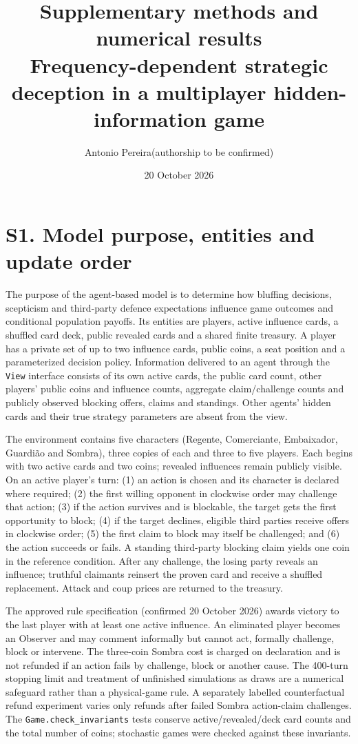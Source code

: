 \documentclass[10pt,a4paper]{article}
\title{Supplementary methods and numerical results\\\normalsize Frequency-dependent strategic deception in a multiplayer hidden-information game}
\author{Antonio Pereira\quad (authorship to be confirmed)}
\date{20 October 2026}
\begin{document}
\maketitle

\section*{S1. Model purpose, entities and update order}
The purpose of the agent-based model is to determine how bluffing decisions, scepticism and third-party defence expectations influence game outcomes and conditional population payoffs. Its entities are players, active influence cards, a shuffled card deck, public revealed cards and a shared finite treasury. A player has a private set of up to two influence cards, public coins, a seat position and a parameterized decision policy. Information delivered to an agent through the \texttt{View} interface consists of its own active cards, the public card count, other players' public coins and influence counts, aggregate claim/challenge counts and publicly observed blocking offers, claims and standings. Other agents' hidden cards and their true strategy parameters are absent from the view.

The environment contains five characters (Regente, Comerciante, Embaixador, Guardi\~ao and Sombra), three copies of each and three to five players. Each begins with two active cards and two coins; revealed influences remain publicly visible. On an active player's turn: (1) an action is chosen and its character is declared where required; (2) the first willing opponent in clockwise order may challenge that action; (3) if the action survives and is blockable, the target gets the first opportunity to block; (4) if the target declines, eligible third parties receive offers in clockwise order; (5) the first claim to block may itself be challenged; and (6) the action succeeds or fails. A standing third-party blocking claim yields one coin in the reference condition. After any challenge, the losing party reveals an influence; truthful claimants reinsert the proven card and receive a shuffled replacement. Attack and coup prices are returned to the treasury.

The approved rule specification (confirmed 20 October 2026) awards victory to the last player with at least one active influence. An eliminated player becomes an Observer and may comment informally but cannot act, formally challenge, block or intervene. The three-coin Sombra cost is charged on declaration and is not refunded if an action fails by challenge, block or another cause. The 400-turn stopping limit and treatment of unfinished simulations as draws are a numerical safeguard rather than a physical-game rule. A separately labelled counterfactual refund experiment varies only refunds after failed Sombra action-claim challenges. The \texttt{Game.check\_invariants} tests conserve active/revealed/deck card counts and the total number of coins; stochastic games were checked against these invariants.
\end{document}
